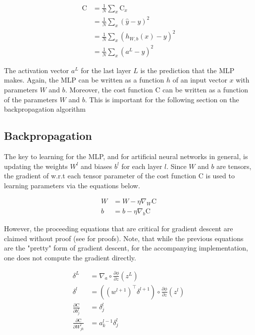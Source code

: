 \documentclass{article}
\begin{document}
\begin{equation}
	\begin{aligned}
		\text{C} & = \frac{1}{N} \sum_{x} {\text{C}_x}            \\
		         & = \frac{1}{N} \sum_{x} {(\hat{y} - y)^{2} }    \\
		         & = \frac{1}{N} \sum_{x} {(h_{W,b}(x) - y)^{2} } \\
		         & = \frac{1}{N} \sum_{x} {(a^{L} - y)^{2} }
	\end{aligned}
\end{equation}

The activation vector $a^{L}$ for the last layer $L$ is the prediction
that the MLP makes. Again, the MLP can be written as a function $h$ of an
input vector $x$ with parameters $W$ and $b$. Moreover, the cost function
C can be written as a function of the parameters $W$ and $b$. This
is important for the following section on the backpropagation algorithm

\subsection{Backpropagation}

The key to learning for the MLP, and for artificial neural networks in general,
is updating the weights $W^{l}$ and biases $b^{l}$ for each layer $l$. Since
$W$ and $b$ are tensors, the gradient of w.r.t each tensor parameter of the
cost function C is used to learning parameters via the equations below.

\begin{align}
	W & = W - \eta \nabla_{W}\text{C} \\
	b & = b - \eta \nabla_{b}\text{C}
\end{align}

However, the proceeding equations that are critical for gradient descent
are claimed without proof (see \cite{Nielsen2015} for proofs). Note, that while
the previous equations are the "pretty" form of gradient descent, for the
accompanying implementation, one does not compute the gradient directly.

\begin{align}
	\delta^{L}                                    & = \nabla_{a} \circ \frac{\partial \phi}{\partial z}(z^{L})                      \\
	\delta^{l}                                    & = ((w^{l+1})^{\top} \delta^{l+1}) \circ \frac{\partial \phi}{\partial z}(z^{l}) \\
	\frac{\partial \text{C}}{\partial b_j^{l}}    & = \delta_j^{l}                                                                  \\
	\frac{\partial \text{C}}{\partial W_{jk}^{l}} & = a_{k}^{l-1}\delta_{j}^{l}
\end{align}
\end{document}
